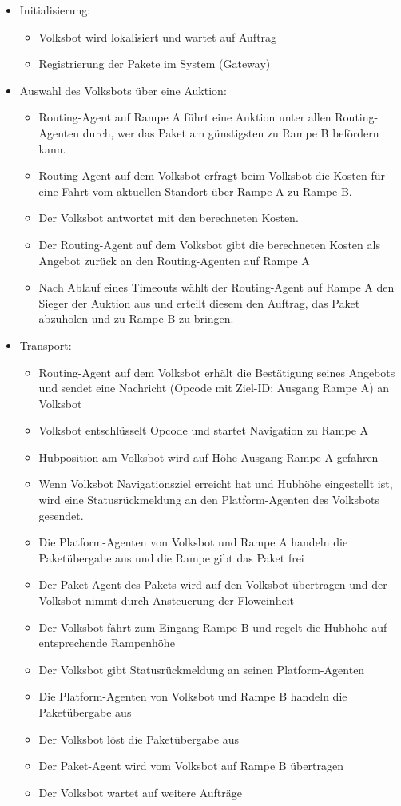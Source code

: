 \begin{itemize}
\item Initialisierung:
\begin{itemize}
\item Volksbot wird lokalisiert und wartet auf Auftrag
\item Registrierung der Pakete im System (Gateway)
\end{itemize}
\item Auswahl des Volksbots über eine Auktion:
\begin{itemize}
\item Routing-Agent auf Rampe A führt eine Auktion unter allen Routing-Agenten durch, wer das Paket am günstigsten zu Rampe B befördern kann.
\item Routing-Agent auf dem Volksbot erfragt beim Volksbot die Kosten für eine Fahrt vom aktuellen Standort über Rampe A zu Rampe B.
\item Der Volksbot antwortet mit den berechneten Kosten.
\item Der Routing-Agent auf dem Volksbot gibt die berechneten Kosten als Angebot zurück an den Routing-Agenten auf Rampe A
\item Nach Ablauf eines Timeouts wählt der Routing-Agent auf Rampe A den Sieger der Auktion aus und erteilt diesem den Auftrag, das Paket abzuholen und zu Rampe B zu bringen.
\end{itemize}
\item Transport:
\begin{itemize}
\item Routing-Agent auf dem Volksbot erhält die Bestätigung seines Angebots und sendet eine Nachricht (Opcode mit Ziel-ID: Ausgang Rampe A) an Volksbot
\item Volksbot entschlüsselt Opcode und startet Navigation zu Rampe A
\item Hubposition am Volksbot wird auf Höhe Ausgang Rampe A gefahren
\item Wenn Volksbot Navigationsziel erreicht hat und Hubhöhe eingestellt ist, wird eine Statusrückmeldung an den Platform-Agenten des Volksbots gesendet.
\item Die Platform-Agenten von Volksbot und Rampe A handeln die Paketübergabe aus und die Rampe gibt das Paket frei
\item Der Paket-Agent des Pakets wird auf den Volksbot übertragen  und der Volksbot nimmt durch Ansteuerung der Floweinheit
\item Der Volksbot fährt zum Eingang Rampe B und regelt die Hubhöhe auf entsprechende Rampenhöhe
\item Der Volksbot gibt Statusrückmeldung an seinen Platform-Agenten
\item Die Platform-Agenten von Volksbot und Rampe B handeln die Paketübergabe aus
\item Der Volksbot löst die Paketübergabe aus
\item Der Paket-Agent wird vom Volksbot auf Rampe B übertragen
\item Der Volksbot wartet auf weitere Aufträge
\end{itemize}
\end{itemize}
